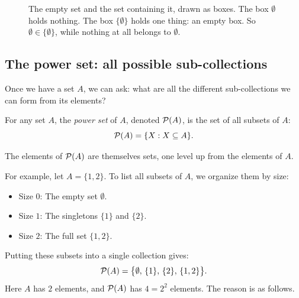 \begin{figure}[htbp]
\centering
{}
\caption{The empty set and the set containing it, drawn as boxes. The box $\emptyset$ holds nothing. The box $\{\emptyset\}$ holds one thing: an empty box. So $\emptyset \in \{\emptyset\}$, while nothing at all belongs to $\emptyset$.}\label{10:fig-empty-boxes}
\end{figure}

\subsection{The power set: all possible sub-collections}

Once we have a set $A$, we can ask: what are all the different sub-collections we can form from its elements?

\begin{definition}
For any set $A$, the \emph{power set} of $A$, denoted $\mathcal{P}(A)$, is the set of all subsets of $A$:
\[
\mathcal{P}(A) = \{X : X \subseteq A\}.
\]
\end{definition}

The elements of $\mathcal{P}(A)$ are themselves sets, one level up from the elements of $A$.

For example, let $A = \{1, 2\}$. To list all subsets of $A$, we organize them by size:
\begin{itemize}
\item Size $0$: The empty set $\emptyset$.
\item Size $1$: The singletons $\{1\}$ and $\{2\}$.
\item Size $2$: The full set $\{1, 2\}$.
\end{itemize}
Putting these subsets into a single collection gives:
\[
\mathcal{P}(A) = \bigl\{\emptyset, \, \{1\}, \, \{2\}, \, \{1, 2\}\bigr\}.
\]
Here $A$ has $2$ elements, and $\mathcal{P}(A)$ has $4 = 2^2$ elements. The reason is as follows.

